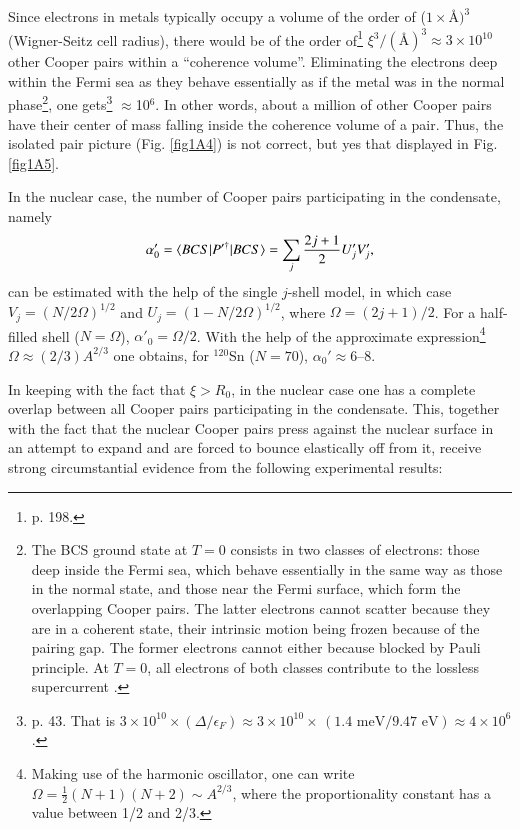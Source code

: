 Since electrons in metals typically occupy a volume of the order of ($1\times$\AA$)^3$ (Wigner-Seitz cell radius), there would be of the order of\footnote{\cite{Ketterson:99} p. 198.} $\xi^3/(\text{\AA})^3\approx 3\times10^{10}$ other Cooper pairs within a ``coherence volume''. Eliminating the electrons deep within the Fermi sea as they behave essentially as if the metal was in the normal phase\footnote{The BCS ground state at $T=0$ consists in two classes of electrons: those deep inside the Fermi sea, which behave essentially in the same way as those in the normal state, and those near the Fermi surface, which form the overlapping Cooper pairs. The latter electrons cannot scatter because they are in a coherent state, their intrinsic motion being frozen because of the pairing gap. The former electrons  cannot either because  blocked by Pauli principle. At $T=0$, all electrons of both classes contribute to the lossless supercurrent \cite{Waldram:96}.}, one gets\footnote{\cite{Schrieffer:64} p. 43.  That is $3\times10^{10}\times(\Delta/\epsilon_F)\approx3\times10^{10}\times\,(1.4\text{ meV}/9.47\text{ eV})\approx 4\times 10^{6}$.} $\approx$10$^6$. In other words, about a million of other Cooper pairs have their center of mass falling inside the coherence volume of a pair. Thus, the isolated pair picture (Fig. \ref{fig1A4}) is not correct, but yes that displayed in Fig. \ref{fig1A5}.





 


 In the nuclear case, the number of Cooper pairs participating in the condensate, namely 
 \begin{align}\label{eq3B11}
\alpha'_0=\langle {BCS|P'^\dagger|BCS} \rangle=\sum_j\frac{2j+1}{2}U'_jV'_j,
 \end{align}
 can be estimated  with the help of the single $j$-shell model, in which case $V_j=(N/2\Omega)^{1/2}$ and $U_j=(1-N/2\Omega)^{1/2}$, where $\Omega=(2j+1)/2$. For a half-filled shell ($N=\Omega$),  $\alpha'_0=\Omega/2$. With the help of the approximate expression\footnote{Making use of the harmonic oscillator, one can write $\Omega=\frac{1}{2}(N+1)(N+2)\sim A^{2/3}$, where the proportionality constant has a value between 1/2 and 2/3.} $\Omega\approx(2/3)A^{2/3}$ one obtains, for $^{120}$Sn ($N=70$), $\alpha_0'\approx6$--8.
 
 
 In keeping with the fact that $\xi>R_0$, in the nuclear case one has a complete overlap between all Cooper pairs participating in the condensate. This, together with the fact that the nuclear Cooper pairs press against the nuclear surface in an attempt to expand and are forced to bounce elastically off from  it, receive strong circumstantial evidence from the following experimental results:
 
